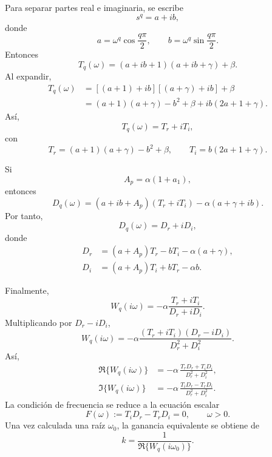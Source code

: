 \documentclass[journal]{IEEEtran}
\begin{document}
Para separar partes real e imaginaria, se escribe
\[
s^q=a+ib,
\]
donde
\begin{equation}
\label{eq:ab_arctan}
a=\omega^q\cos\frac{q\pi}{2},
\qquad
b=\omega^q\sin\frac{q\pi}{2}.
\end{equation}
Entonces
\[
T_q(\omega)
=
(a+ib+1)(a+ib+\gamma)+\beta.
\]
Al expandir,
\begin{align}
T_q(\omega)
&=
\left[(a+1)+ib\right]\left[(a+\gamma)+ib\right]+\beta\\
&=
(a+1)(a+\gamma)-b^2+\beta
+
ib(2a+1+\gamma).
\end{align}
Así,
\begin{equation}
\label{eq:TrTi_arctan}
T_q(\omega)=T_r+iT_i,
\end{equation}
con
\begin{equation}
T_r=(a+1)(a+\gamma)-b^2+\beta,
\qquad
T_i=b(2a+1+\gamma).
\end{equation}

Si
\begin{equation}
\label{eq:Ap_arctan}
A_p=\alpha(1+a_1),
\end{equation}
entonces
\[
D_q(\omega)
=
(a+ib+A_p)(T_r+iT_i)-\alpha(a+\gamma+ib).
\]
Por tanto,
\begin{equation}
\label{eq:DrDi_arctan}
D_q(\omega)=D_r+iD_i,
\end{equation}
donde
\begin{equation}
\begin{aligned}
D_r&=(a+A_p)T_r-bT_i-\alpha(a+\gamma),\\
D_i&=(a+A_p)T_i+bT_r-\alpha b.
\end{aligned}
\end{equation}

Finalmente,
\[
W_q(i\omega)
=
-\alpha\frac{T_r+iT_i}{D_r+iD_i}.
\]
Multiplicando por \(D_r-iD_i\),
\[
W_q(i\omega)
=
-\alpha
\frac{(T_r+iT_i)(D_r-iD_i)}{D_r^2+D_i^2}.
\]
Así,
\begin{equation}
\label{eq:real_imag_W_arctan}
\begin{aligned}
\Re\{W_q(i\omega)\}
&=
-\alpha\,\tfrac{T_rD_r+T_iD_i}{D_r^2+D_i^2},\\
\Im\{W_q(i\omega)\}
&=
-\alpha\,\tfrac{T_iD_r-T_rD_i}{D_r^2+D_i^2}.
\end{aligned}
\end{equation}
La condición de frecuencia se reduce a la ecuación escalar
\begin{equation}
\label{eq:freq_scalar_arctan}
F(\omega)
:=
T_iD_r-T_rD_i
=
0,
\qquad
\omega>0.
\end{equation}
Una vez calculada una raíz \(\omega_0\), la ganancia equivalente se obtiene de
\begin{equation}
\label{eq:k_from_W_arctan}
k=
\frac{1}{\Re\{W_q(i\omega_0)\}}.
\end{equation}
\end{document}
